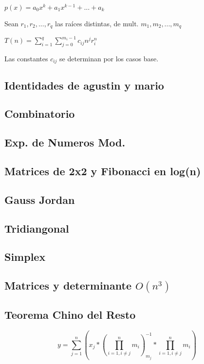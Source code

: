 $p(x)=a_0 x^k + a_1 x^{k-1} + ... + a_k$

Sean $r_1,r_2,...,r_q$ las raíces distintas, de mult. $m_1, m_2, ..., m_q$

$T(n)=\sum_{i=1}^q{\sum_{j=0}^{m_i - 1}c_{ij} n^j r_i^n}$

Las constantes $c_{ij}$ se determinan por los casos base.

\subsection{Identidades de agustin y mario}


\subsection{Combinatorio}

\subsection{Exp. de Numeros Mod.}

\subsection{Matrices de 2x2 y Fibonacci en log(n)}

\subsection{Gauss Jordan}
\subsection{Tridiangonal}
\subsection{Simplex}

\subsection{Matrices y determinante $O(n^3)$}

\subsection{Teorema Chino del Resto}
$$y=\sum_{j=1}^n (x_j*(\prod_{i=1, i\neq j}^n m_i)_{m_j}^{-1}*\prod_{i=1, i\neq j}^n m_i)$$

